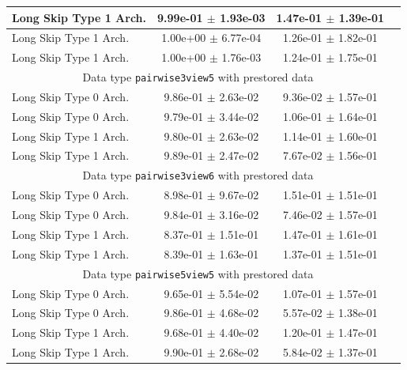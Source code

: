 \documentclass[a4paper]{article}
\begin{document}
\begin{table}[H]
\begin{tabular}{|l|c|c|c|}
Long Skip Type 1 Arch.   & 9.99e-01 $\pm$ 1.93e-03 & 1.47e-01 $\pm$ 1.39e-01 \\ \hline
Long Skip Type 1 Arch.   & 1.00e+00 $\pm$ 6.77e-04 & 1.26e-01 $\pm$ 1.82e-01 \\ \hline
Long Skip Type 1 Arch.   & 1.00e+00 $\pm$ 1.76e-03 & 1.24e-01 $\pm$ 1.75e-01 \\ \hline
\multicolumn{3}{|c|}{Data type \texttt{pairwise3view5} with prestored data} \\ \hline
Long Skip Type 0 Arch.   & 9.86e-01 $\pm$ 2.63e-02 & 9.36e-02 $\pm$ 1.57e-01 \\ \hline
Long Skip Type 0 Arch.   & 9.79e-01 $\pm$ 3.44e-02 & 1.06e-01 $\pm$ 1.64e-01 \\ \hline
Long Skip Type 1 Arch.   & 9.80e-01 $\pm$ 2.63e-02 & 1.14e-01 $\pm$ 1.60e-01 \\ \hline
Long Skip Type 1 Arch.   & 9.89e-01 $\pm$ 2.47e-02 & 7.67e-02 $\pm$ 1.56e-01 \\ \hline
\multicolumn{3}{|c|}{Data type \texttt{pairwise3view6} with prestored data} \\ \hline
Long Skip Type 0 Arch.   & 8.98e-01 $\pm$ 9.67e-02 & 1.51e-01 $\pm$ 1.51e-01 \\ \hline
Long Skip Type 0 Arch.   & 9.84e-01 $\pm$ 3.16e-02 & 7.46e-02 $\pm$ 1.57e-01 \\ \hline
Long Skip Type 1 Arch.   & 8.37e-01 $\pm$ 1.51e-01 & 1.47e-01 $\pm$ 1.61e-01 \\ \hline
Long Skip Type 1 Arch.   & 8.39e-01 $\pm$ 1.63e-01 & 1.37e-01 $\pm$ 1.51e-01 \\ \hline
\multicolumn{3}{|c|}{Data type \texttt{pairwise5view5} with prestored data} \\ \hline
Long Skip Type 0 Arch.   & 9.65e-01 $\pm$ 5.54e-02 & 1.07e-01 $\pm$ 1.57e-01 \\ \hline
Long Skip Type 0 Arch.   & 9.86e-01 $\pm$ 4.68e-02 & 5.57e-02 $\pm$ 1.38e-01 \\ \hline
Long Skip Type 1 Arch.   & 9.68e-01 $\pm$ 4.40e-02 & 1.20e-01 $\pm$ 1.47e-01 \\ \hline
Long Skip Type 1 Arch.   & 9.90e-01 $\pm$ 2.68e-02 & 5.84e-02 $\pm$ 1.37e-01 \\ \hline
      \end{tabular}
      \label{fig:tab1}
\end{table}
\end{document}
